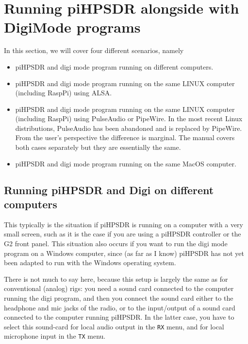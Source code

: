 \documentclass[12pt]{book}
\def\bltt#1{\texttt{\color{blue}#1}}
\def\pH{pi\-HPSDR\xspace}
\begin{document}
\chapter[\pH and digi mode programs]{Running \pH alongside with DigiMode programs}

In this section, we will cover four different scenarios, namely
\begin{itemize}
\item{\pH and digi mode program running on different computers.}
\item{\pH and digi mode program running on the same LINUX computer
(including RaspPi) using ALSA.}
\item{\pH and digi mode program running on the same LINUX computer
(including RaspPi) using PulseAudio or PipeWire. {\color{red} In the most recent Linux distributions,
 PulseAudio has been abandoned and is replaced by
PipeWire. From the user's perspective the difference is marginal.
The manual covers both cases separately but they are essentially the same.}}
\item{\pH and digi mode program running on the same MacOS computer.}
\end{itemize}



\section[\pH and Digi on different computers]{Running \pH and Digi on different computers}

This typically is the situation if \pH is running on a computer with a very small
screen, such as it is the case if you are using a \pH controller or the G2 front panel.
This situation also occurs if you want to run the digi mode program on a Windows computer,
since (as far as I know) \pH has not yet been adapted to run with the Windows operating
system.

There is not much to say here, because this setup is largely the same as for conventional
(analog) rigs: you need a sound card connected to the computer running the digi program,
and then you connect the sound card either to the headphone and mic jacks of the radio,
or to the input/output of a sound card connected to the computer running \pH. In the
latter case, you have to select this sound-card for local audio output in the \bltt{RX} menu,
and for local microphone input in the \bltt{TX} menu.
\end{document}
